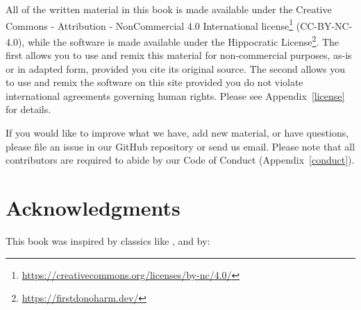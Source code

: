 \documentclass{scrbook}
\newcommand{\appref}[1]{Appendix~\ref{#1}}
\newcommand{\hreffoot}[2]{{#1}\footnote{\href{#2}{#2}}}
\begin{document}
All of the written material in this book
is made available under the \hreffoot{Creative Commons - Attribution - NonCommercial 4.0 International license}{https://creativecommons.org/licenses/by-nc/4.0/}
(CC-BY-NC-4.0),
while the software is made available under the \hreffoot{Hippocratic License}{https://firstdonoharm.dev/}.
The first allows you to use and remix this material for non-commercial purposes,
as-is or in adapted form,
provided you cite its original source.
The second allows you to use and remix the software on this site
provided you do not violate international agreements governing human rights.
Please see \appref{license} for details.


If you would like to improve what we have,
add new material,
or have questions,
please file an issue in our GitHub repository or send us email.
Please note that all contributors are required to abide by our Code of Conduct
(\appref{conduct}).

\section{Acknowledgments}\label{introduction-acknowledgments}


This book was inspired by
classics like \cite{Kernighan1979,Kernighan1981,Kernighan1983,Kernighan1988,Petre2016},
and by:
\end{document}
